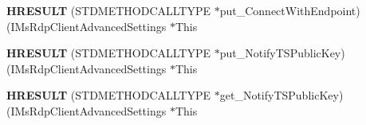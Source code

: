\begin{DoxyCompactItemize}
{\bfseries H\+R\+E\+S\+U\+LT} (S\+T\+D\+M\+E\+T\+H\+O\+D\+C\+A\+L\+L\+T\+Y\+PE $\ast$put\+\_\+\+Connect\+With\+Endpoint)(I\+Ms\+Rdp\+Client\+Advanced\+Settings $\ast$This
\item 
\mbox{\label{struct_i_ms_rdp_client_advanced_settings_vtbl_ae91311db250369c1ec2839dcc8ad966c}} 
{\bfseries H\+R\+E\+S\+U\+LT} (S\+T\+D\+M\+E\+T\+H\+O\+D\+C\+A\+L\+L\+T\+Y\+PE $\ast$put\+\_\+\+Notify\+T\+S\+Public\+Key)(I\+Ms\+Rdp\+Client\+Advanced\+Settings $\ast$This
\item 
\mbox{\label{struct_i_ms_rdp_client_advanced_settings_vtbl_aa52218b3975040138f5653887de3558b}} 
{\bfseries H\+R\+E\+S\+U\+LT} (S\+T\+D\+M\+E\+T\+H\+O\+D\+C\+A\+L\+L\+T\+Y\+PE $\ast$get\+\_\+\+Notify\+T\+S\+Public\+Key)(I\+Ms\+Rdp\+Client\+Advanced\+Settings $\ast$This
\end{DoxyCompactItemize}
